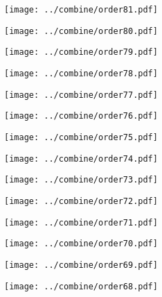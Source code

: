 \documentclass{article}
\begin{document}
\begin{figure}[H]
    \centering
    \texttt{[image: ../combine/order81.pdf]}
\end{figure}
\begin{figure}[H]
    \centering
    \texttt{[image: ../combine/order80.pdf]}
\end{figure}
\begin{figure}[H]
    \centering
    \texttt{[image: ../combine/order79.pdf]}
\end{figure}
\begin{figure}[H]
    \centering
    \texttt{[image: ../combine/order78.pdf]}
\end{figure}
\begin{figure}[H]
    \centering
    \texttt{[image: ../combine/order77.pdf]}
\end{figure}
\begin{figure}[H]
    \centering
    \texttt{[image: ../combine/order76.pdf]}
\end{figure}
\begin{figure}[H]
    \centering
    \texttt{[image: ../combine/order75.pdf]}
\end{figure}
\begin{figure}[H]
    \centering
    \texttt{[image: ../combine/order74.pdf]}
\end{figure}
\begin{figure}[H]
    \centering
    \texttt{[image: ../combine/order73.pdf]}
\end{figure}
\begin{figure}[H]
    \centering
    \texttt{[image: ../combine/order72.pdf]}
\end{figure}
\begin{figure}[H]
    \centering
    \texttt{[image: ../combine/order71.pdf]}
\end{figure}
\begin{figure}[H]
    \centering
    \texttt{[image: ../combine/order70.pdf]}
\end{figure}
\begin{figure}[H]
    \centering
    \texttt{[image: ../combine/order69.pdf]}
\end{figure}
\begin{figure}[H]
    \centering
    \texttt{[image: ../combine/order68.pdf]}
\end{figure}
\end{document}
